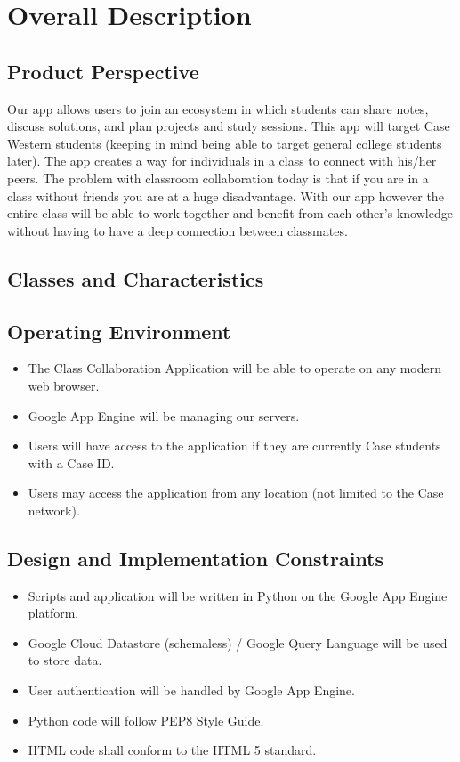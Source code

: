 \documentclass{scrreprt}
\begin{document}
\chapter{Overall Description}
\section{Product Perspective}
Our app allows users to join an ecosystem in which students can share notes, discuss solutions, and plan projects and study sessions. This app will target Case Western students (keeping in mind being able to target general college students later). The app creates a way for individuals in a class to connect with his/her peers. The problem with classroom collaboration today is that if you are in a class without friends you are at a huge disadvantage. With our app however the entire class will be able to work together and benefit from each other’s knowledge without having to have a deep connection between classmates.
\section{Classes and Characteristics}

\section{Operating Environment}
\begin{itemize}
	\item The Class Collaboration Application will be able to operate on any modern web browser.
	\item Google App Engine will be managing our servers.
	\item Users will have access to the application if they are currently Case students with a Case ID.
	\item Users may access the application from any location (not limited to the Case network).
\end{itemize}

\section{Design and Implementation Constraints}
\begin{itemize}
	\item Scripts and application will be written in Python on the Google App Engine platform.
	\item Google Cloud Datastore (schemaless) / Google Query Language will be used to store data.
	\item User authentication will be handled by Google App Engine.
	\item Python code will follow PEP8 Style Guide.
	\item HTML code shall conform to the HTML 5 standard.
\end{itemize}
\end{document}
